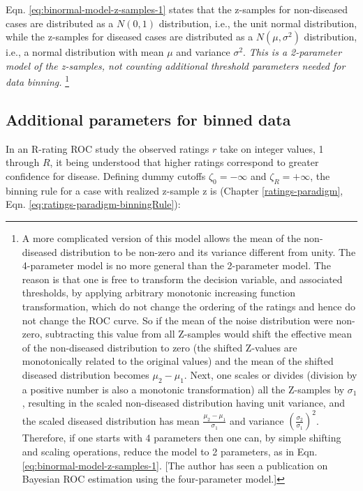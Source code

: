 \documentclass[
]{book}
\begin{document}
Eqn. \eqref{eq:binormal-model-z-samples-1} states that the z-samples for non-diseased cases are distributed as a \(N(0,1)\) distribution, i.e., the unit normal distribution, while the z-samples for diseased cases are distributed as a \(N(\mu,\sigma^2)\) distribution, i.e., a normal distribution with mean \(\mu\) and variance \(\sigma^2\). \emph{This is a 2-parameter model of the z-samples, not counting additional threshold parameters needed for data binning.} \footnote{A more complicated version of this model allows the mean of the non-diseased distribution to be non-zero and its variance different from unity. The 4-parameter model is no more general than the 2-parameter model. The reason is that one is free to transform the decision variable, and associated thresholds, by applying arbitrary monotonic increasing function transformation, which do not change the ordering of the ratings and hence do not change the ROC curve. So if the mean of the noise distribution were non-zero, subtracting this value from all Z-samples would shift the effective mean of the non-diseased distribution to zero (the shifted Z-values are monotonically related to the original values) and the mean of the shifted diseased distribution becomes \(\mu_2-\mu_1\). Next, one scales or divides (division by a positive number is also a monotonic transformation) all the Z-samples by \(\sigma_1\), resulting in the scaled non-diseased distribution having unit variance, and the scaled diseased distribution has mean \(\frac{\mu_2-\mu_1}{\sigma_1}\) and variance \((\frac{\sigma_2}{\sigma_1})^2\). Therefore, if one starts with 4 parameters then one can, by simple shifting and scaling operations, reduce the model to 2 parameters, as in Eqn. \eqref{eq:binormal-model-z-samples-1}. {[}The author has seen a publication on Bayesian ROC estimation using the four-parameter model.{]}}

\hypertarget{additional-parameters-for-binned-data}{%
\subsection{Additional parameters for binned data}\label{additional-parameters-for-binned-data}}

In an R-rating ROC study the observed ratings \(r\) take on integer values, 1 through \(R\), it being understood that higher ratings correspond to greater confidence for disease. Defining dummy cutoffs \(\zeta_0 = -\infty\) and \(\zeta_R = +\infty\), the binning rule for a case with realized z-sample z is (Chapter \ref{ratings-paradigm}, Eqn. \eqref{eq:ratings-paradigm-binningRule}):
\end{document}
